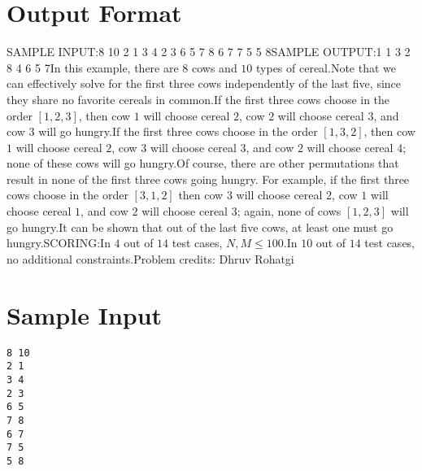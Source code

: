 \documentclass[12pt]{article}
\begin{document}
\section*{Output Format}
SAMPLE INPUT:8 10
2 1
3 4
2 3
6 5
7 8
6 7
7 5
5 8SAMPLE OUTPUT:1
1
3
2
8
4
6
5
7In this example, there are $8$ cows and $10$ types of cereal.Note that we can effectively solve for the first three cows independently of 
the last five, since they share no favorite cereals in common.If the first three cows choose in the order $[1,2,3]$, then cow $1$ will choose
cereal $2$, cow $2$ will choose cereal $3$, and cow $3$ will go hungry.If the first three cows choose in the order $[1,3,2]$, then cow $1$ will choose
cereal $2$, cow $3$ will choose cereal $3$, and cow $2$ will choose cereal $4$;
none of these cows will go hungry.Of course, there are other permutations that result in none of the first three
cows going hungry. For example, if the first three cows choose in the order
$[3,1,2]$ then cow $3$ will choose cereal $2$, cow $1$ will choose cereal $1$,
and cow $2$ will choose cereal $3$; again, none of cows $[1,2,3]$ will go
hungry.It can be shown that out of the last five cows, at least one must go hungry.SCORING:In $4$ out of $14$ test cases, $N,M\le 100$.In $10$ out of $14$ test cases, no additional constraints.Problem credits: Dhruv Rohatgi

\section*{Sample Input}
\begin{verbatim}
8 10
2 1
3 4
2 3
6 5
7 8
6 7
7 5
5 8
\end{verbatim}
\end{document}
